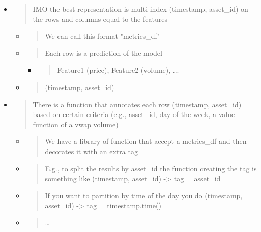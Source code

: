 \documentclass[11pt, reqno]{amsart}
\begin{document}
\begin{itemize}
\item
  \begin{quote}
  IMO the best representation is multi-index (timestamp, asset\_id) on
  the rows and columns equal to the features
  \end{quote}

  \begin{itemize}
  \item
    \begin{quote}
    We can call this format "metrics\_df"
    \end{quote}
  \item
    \begin{quote}
    Each row is a prediction of the model
    \end{quote}

    \begin{itemize}
    \item
      \begin{quote}
      Feature1 (price), Feature2 (volume), ...
      \end{quote}
    \end{itemize}
  \item
    \begin{quote}
    (timestamp, asset\_id)
    \end{quote}
  \end{itemize}
\item
  \begin{quote}
  There is a function that annotates each row (timestamp, asset\_id)
  based on certain criteria (e.g., asset\_id, day of the week, a value
  function of a vwap volume)
  \end{quote}

  \begin{itemize}
  \item
    \begin{quote}
    We have a library of function that accept a metrics\_df and then
    decorates it with an extra tag
    \end{quote}
  \item
    \begin{quote}
    E.g., to split the results by asset\_id the function creating the
    tag is something like (timestamp, asset\_id) -\textgreater{} tag =
    asset\_id
    \end{quote}
  \item
    \begin{quote}
    If you want to partition by time of the day you do (timestamp,
    asset\_id) -\textgreater{} tag = timestamp.time()
    \end{quote}
  \item
    \begin{quote}
    \ldots{}
    \end{quote}
  \end{itemize}
\end{itemize}
\end{document}
